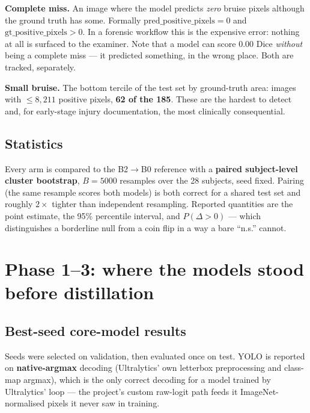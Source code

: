 \documentclass[11pt]{article}
\begin{document}
\textbf{Complete miss.} An image where the model predicts \emph{zero} bruise pixels although the
ground truth has some. Formally $\mathrm{pred\_positive\_pixels}=0$ and
$\mathrm{gt\_positive\_pixels}>0$. In a forensic workflow this is the expensive error: nothing at
all is surfaced to the examiner. Note that a model can score $0.00$ Dice \emph{without} being a
complete miss --- it predicted something, in the wrong place. Both are tracked, separately.

\textbf{Small bruise.} The bottom tercile of the test set by ground-truth area: images with
$\le 8{,}211$ positive pixels, \textbf{62 of the 185}. These are the hardest to detect and, for
early-stage injury documentation, the most clinically consequential.

\subsection{Statistics}

Every arm is compared to the B2$\to$B0 reference with a \textbf{paired subject-level cluster
bootstrap}, $B=5000$ resamples over the 28 subjects, seed fixed. Pairing (the same resample scores
both models) is both correct for a shared test set and roughly $2\times$ tighter than independent
resampling. Reported quantities are the point estimate, the 95\% percentile interval, and
$P(\Delta>0)$ --- which distinguishes a borderline null from a coin flip in a way a bare
``n.s.'' cannot.

\section{Phase 1--3: where the models stood before distillation}

\subsection{Best-seed core-model results}
\label{sec:bestseed}

Seeds were selected on validation, then evaluated once on test. YOLO is reported on
\textbf{native-argmax} decoding (Ultralytics' own letterbox preprocessing and class-map argmax),
which is the only correct decoding for a model trained by Ultralytics' loop --- the project's
custom raw-logit path feeds it ImageNet-normalised pixels it never saw in training.
\end{document}
